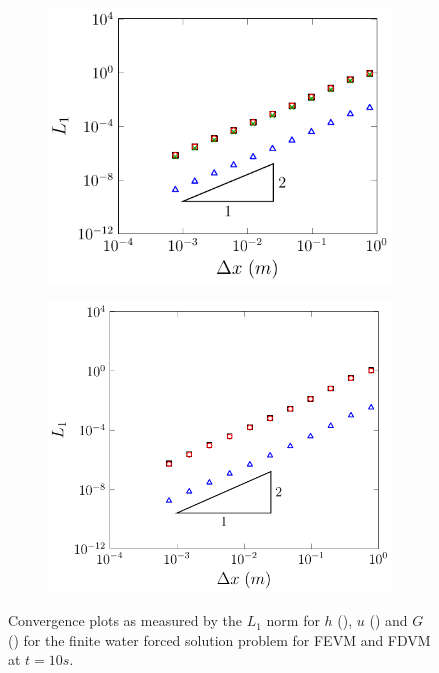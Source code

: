 \begin{figure}
	\centering
	\begin{subfigure}{0.5\textwidth}
		\includegraphics[width=\textwidth]{./chp5/figures/Forced/Wet/FEVML1.pdf}
		\vspace{0.5cm}
	\end{subfigure}%
	\begin{subfigure}{0.5\textwidth}
		\includegraphics[width=\textwidth]{./chp5/figures/Forced/Wet/FDVML1.pdf}
		\vspace{0.5cm}
	\end{subfigure}
	\caption{Convergence plots as measured by the $L_1$ norm for $h$ (), $u$ () and $G$ () for the finite water forced solution problem for FEVM and FDVM at $t=10s$.}
	\label{fig:L1convergenceforcedWet}
\end{figure}


